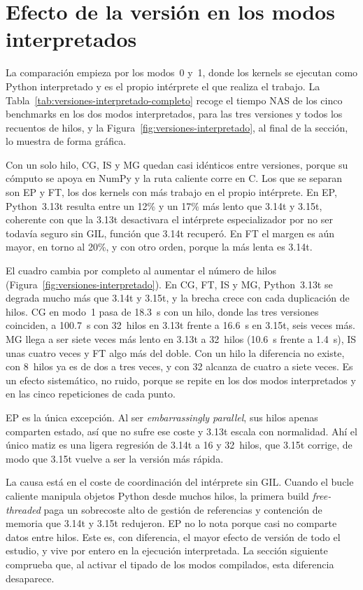 \section{Efecto de la versión en los modos interpretados}
\label{sec:versiones-interpretado}

La comparación empieza por los modos~0 y~1, donde los kernels se ejecutan como
Python interpretado y es el propio intérprete el que realiza el trabajo. La
Tabla~\ref{tab:versiones-interpretado-completo} recoge el tiempo NAS de los cinco
benchmarks en los dos modos interpretados, para las tres versiones y todos los
recuentos de hilos, y la Figura~\ref{fig:versiones-interpretado}, al final de la
sección, lo muestra de forma gráfica.



Con un solo hilo, CG, IS y MG quedan casi idénticos entre versiones, porque su
cómputo se apoya en NumPy y la ruta caliente corre en C. Los que se separan son
EP y FT, los dos kernels con más trabajo en el propio intérprete. En EP,
Python~3.13t resulta entre un 12\% y un 17\% más lento que 3.14t y 3.15t,
coherente con que la 3.13t desactivara el intérprete especializador por no ser
todavía seguro sin GIL, función que 3.14t recuperó. En FT el margen es aún mayor,
en torno al 20\%, y con otro orden, porque la más lenta es 3.14t.

El cuadro cambia por completo al aumentar el número de hilos
(Figura~\ref{fig:versiones-interpretado}). En CG, FT, IS y MG, Python~3.13t se
degrada mucho más que 3.14t y 3.15t, y la brecha crece con cada duplicación de
hilos. CG en modo~1 pasa de 18.3~s con un hilo, donde las tres versiones
coinciden, a 100.7~s con 32~hilos en 3.13t frente a 16.6~s en 3.15t, seis veces
más. MG llega a ser siete veces más lento en 3.13t a 32~hilos (10.6~s frente a
1.4~s), IS unas cuatro veces y FT algo más del doble. Con un hilo la diferencia no
existe, con 8~hilos ya es de dos a tres veces, y con 32 alcanza de cuatro a siete
veces. Es un efecto sistemático, no ruido, porque se repite en los dos modos
interpretados y en las cinco repeticiones de cada punto.

EP es la única excepción. Al ser \emph{embarrassingly parallel}, sus hilos apenas
comparten estado, así que no sufre ese coste y 3.13t escala con normalidad. Ahí
el único matiz es una ligera regresión de 3.14t a 16 y 32~hilos, que 3.15t
corrige, de modo que 3.15t vuelve a ser la versión más rápida.

La causa está en el coste de coordinación del intérprete sin GIL. Cuando el bucle
caliente manipula objetos Python desde muchos hilos, la primera build
\emph{free-threaded} paga un sobrecoste alto de gestión de referencias y
contención de memoria que 3.14t y 3.15t redujeron. EP no lo nota porque casi no
comparte datos entre hilos. Este es, con diferencia, el mayor efecto de versión
de todo el estudio, y vive por entero en la ejecución interpretada. La sección
siguiente comprueba que, al activar el tipado de los modos compilados, esta
diferencia desaparece.

